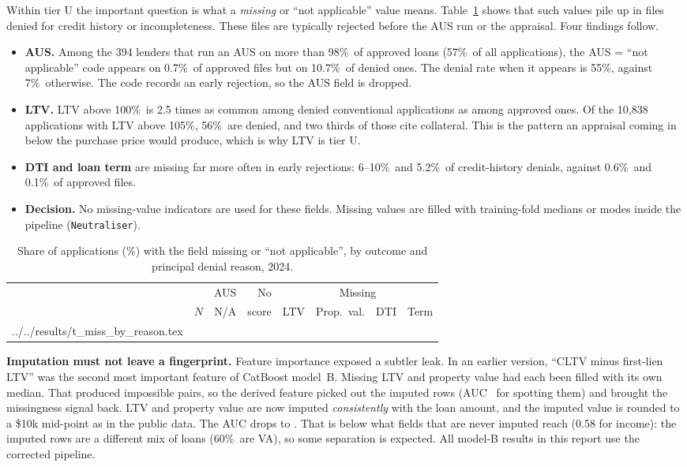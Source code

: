 \documentclass[11pt,a4paper]{article}
\newcommand{\pct}{\%}
\begin{document}
Within tier U the important question is what a \emph{missing} or ``not applicable'' value
means. Table~\ref{tab:miss} shows that such values pile up in files denied for credit
history or incompleteness. These files are typically rejected before the AUS run or the
appraisal. Four findings follow.
\begin{itemize}
  \item \textbf{AUS.} Among the 394 lenders that run an AUS on more than 98\pct\ of approved
  loans (57\pct\ of all applications), the AUS = ``not applicable'' code appears on 0.7\pct\
  of approved files but on 10.7\pct\ of denied ones. The denial rate when it appears is
  55\pct, against 7\pct\ otherwise. The code records an early rejection, so the AUS field is
  dropped.
  \item \textbf{LTV.} LTV above 100\pct\ is 2.5 times as common among denied conventional
  applications as among approved ones. Of the 10{,}838 applications with LTV above 105\pct,
  56\pct\ are denied, and two thirds of those cite collateral. This is the pattern an
  appraisal coming in below the purchase price would produce, which is why LTV is tier U.
  \item \textbf{DTI and loan term} are missing far more often in early rejections: 6--10\pct\
  and 5.2\pct\ of credit-history denials, against 0.6\pct\ and 0.1\pct\ of approved files.
  \item \textbf{Decision.} No missing-value indicators are used for these fields. Missing
  values are filled with training-fold medians or modes inside the pipeline
  (\texttt{Neutraliser}).
\end{itemize}

\begin{table}[!htbp]
\centering\small
\caption{Share of applications (\%) with the field missing or ``not applicable'', by outcome
and principal denial reason, 2024.}
\label{tab:miss}
\begin{tabular}{@{}lrrrrrrr@{}}
\toprule
 & & AUS & No & \multicolumn{4}{c}{Missing} \\
\cmidrule(l){5-8}
 & $N$ & N/A & score & LTV & Prop.\ val. & DTI & Term \\
\midrule
\tabinput ../../results/t_miss_by_reason.tex
\bottomrule
\end{tabular}
\end{table}

\textbf{Imputation must not leave a fingerprint.} Feature importance exposed a subtler leak.
In an earlier version, ``CLTV minus first-lien LTV'' was the second most important feature of
CatBoost model~B. Missing LTV and property value had each been filled with its own median.
That produced impossible pairs, so the derived feature picked out the imputed rows
(AUC \ImpOld\ for spotting them) and brought the missingness signal back. LTV and property value are now imputed
\emph{consistently} with the loan amount, and the imputed value is rounded to a \$10k
mid-point as in the public data. The AUC drops to \ImpNew. That is below what fields that are never imputed reach (0.58 for
income): the imputed rows are a different mix of loans (60\pct\ are VA), so some
separation is expected. All model-B
results in this report use the corrected pipeline.
\end{document}
